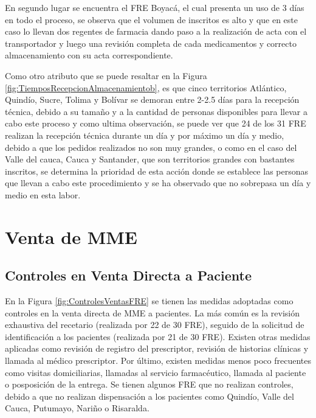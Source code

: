\documentclass[
]{book}
\begin{document}
En segundo lugar se encuentra el FRE Boyacá, el cual presenta un uso de 3 días en todo el proceso, se observa que el volumen de inscritos es alto y que en este caso lo llevan dos regentes de farmacia dando paso a la realización de acta con el transportador y luego una revisión completa de cada medicamentos y correcto almacenamiento con su acta correspondiente.

Como otro atributo que se puede resaltar en la Figura \ref{fig:TiemposRecepcionAlmacenamientob}, es que cinco territorios Atlántico, Quindío, Sucre, Tolima y Bolívar se demoran entre 2-2.5 días para la recepción técnica, debido a su tamaño y a la cantidad de personas disponibles para llevar a cabo este proceso y como ultima observación, se puede ver que 24 de los 31 FRE realizan la recepción técnica durante un día y por máximo un día y medio, debido a que los pedidos realizados no son muy grandes, o como en el caso del Valle del cauca, Cauca y Santander, que son territorios grandes con bastantes inscritos, se determina la prioridad de esta acción donde se establece las personas que llevan a cabo este procedimiento y se ha observado que no sobrepasa un día y medio en esta labor.

\hypertarget{venta-de-mme}{%
\section{Venta de MME}\label{venta-de-mme}}


\hypertarget{controles-en-venta-directa-a-paciente}{%
\subsection{Controles en Venta Directa a Paciente}\label{controles-en-venta-directa-a-paciente}}

En la Figura \ref{fig:ControlesVentasFRE} se tienen las medidas adoptadas como controles en la venta directa de MME a pacientes. La más común es la revisión exhaustiva del recetario (realizada por 22 de 30 FRE), seguido de la solicitud de identificación a los pacientes (realizada por 21 de 30 FRE). Existen otras medidas aplicadas como revisión de registro del prescriptor, revisión de historias clínicas y llamada al médico prescriptor. Por último, existen medidas menos poco frecuentes como visitas domiciliarias, llamadas al servicio farmacéutico, llamada al paciente o posposición de la entrega. Se tienen algunos FRE que no realizan controles, debido a que no realizan dispensación a los pacientes como Quindío, Valle del Cauca, Putumayo, Nariño o Risaralda.
\end{document}
